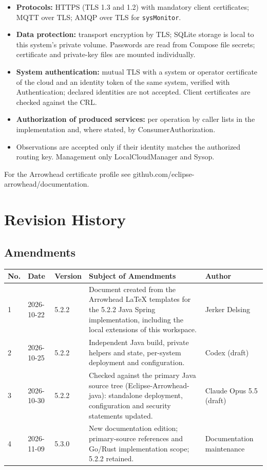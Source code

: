 \documentclass[a4paper]{arrowhead}
\begin{document}
\begin{itemize}
  \item \textbf{Protocols:} HTTPS (TLS 1.3 and 1.2) with mandatory client certificates; MQTT over TLS; AMQP over TLS for \texttt{sysMonitor}.
  \item \textbf{Data protection:} transport encryption by TLS; SQLite storage is local to this system's private volume. Passwords are read from Compose file secrets; certificate and private-key files are mounted individually.
  \item \textbf{System authentication:} mutual TLS with a system or operator certificate of the cloud and an identity token of the same system, verified with Authentication; declared identities are not accepted. Client certificates are checked against the CRL.
  \item \textbf{Authorization of produced services:} per operation by caller lists in the implementation and, where stated, by ConsumerAuthorization.
  \item Observations are accepted only if their identity matches the authorized routing key. Management only LocalCloudManager and Sysop.
\end{itemize}

For the Arrowhead certificate profile see github.com/eclipse-arrowhead/documentation.





\newpage

\section{Revision History}
\subsection{Amendments}

\noindent\begin{tabularx}{\textwidth}{| p{1cm} | p{3cm} | p{2cm} | X | p{4cm} |} \hline
\rowcolor{gray!33} No. & Date & Version & Subject of Amendments & Author \\ \hline

1 & 2026-10-22 & 5.2.2 & Document created from the Arrowhead LaTeX templates for the 5.2.2 Java Spring implementation, including the local extensions of this workspace. & Jerker Delsing \\ \hline
2 & 2026-10-25 & 5.2.2 & Independent Java build, private helpers and state, per-system deployment and configuration. & Codex (draft) \\ \hline
3 & 2026-10-30 & 5.2.2 & Checked against the primary Java source tree (Eclipse-Arrowhead-java): standalone deployment, configuration and security statements updated. & Claude Opus 5.5 (draft) \\ \hline
4 & 2026-11-09 & 5.3.0 & New documentation edition; primary-source references and Go/Rust implementation scope; 5.2.2 retained. & Documentation maintenance \\ \hline
\end{tabularx}
\end{document}
